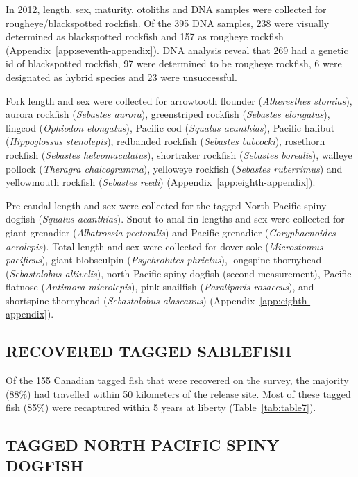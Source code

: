 \documentclass[12pt]{article}\usepackage[]{graphicx}\usepackage[]{color}
\begin{document}
In 2012, length, sex, maturity, otoliths and DNA samples were collected for rougheye/blackspotted rockfish. Of the 395 DNA samples, 238 were visually determined as blackspotted rockfish and 157 as rougheye rockfish (Appendix~\ref{app:seventh-appendix}). DNA analysis reveal that 269 had a genetic id of blackspotted rockfish, 97 were determined to be rougheye rockfish, 6 were designated as hybrid species and 23 were unsuccessful.

Fork length and sex were collected for arrowtooth flounder (\emph{Atheresthes stomias}), aurora rockfish (\emph{Sebastes aurora}), greenstriped rockfish (\emph{Sebastes elongatus}), lingcod (\emph{Ophiodon elongatus}), Pacific cod (\emph{Squalus acanthias}), Pacific halibut (\emph{Hippoglossus stenolepis}), redbanded rockfish (\emph{Sebastes babcocki}), rosethorn rockfish (\emph{Sebastes helvomaculatus}), shortraker rockfish (\emph{Sebastes borealis}), walleye pollock (\emph{Theragra chalcogramma}), yelloweye rockfish (\emph{Sebastes ruberrimus}) and yellowmouth rockfish (\emph{Sebastes reedi}) (Appendix~\ref{app:eighth-appendix}).

Pre-caudal length and sex were collected for the tagged North Pacific spiny dogfish (\emph{Squalus acanthias}). Snout to anal fin lengths and sex were collected for giant grenadier (\emph{Albatrossia pectoralis}) and Pacific grenadier (\emph{Coryphaenoides acrolepis}). Total length and sex were collected for dover sole (\emph{Microstomus pacificus}), giant blobsculpin (\emph{Psychrolutes phrictus}), longspine thornyhead (\emph{Sebastolobus altivelis}), north Pacific spiny dogfish (second measurement), Pacific flatnose (\emph{Antimora microlepis}), pink snailfish (\emph{Paraliparis rosaceus}), and shortspine thornyhead (\emph{Sebastolobus alascanus}) (Appendix~\ref{app:eighth-appendix}).

\hypertarget{recovered-tagged-sablefish}{%
\subsection{RECOVERED TAGGED SABLEFISH}\label{recovered-tagged-sablefish}}

Of the 155 Canadian tagged fish that were recovered on the survey, the majority (88\%) had travelled within 50 kilometers of the release site. Most of these tagged fish (85\%) were recaptured within 5 years at liberty (Table~\ref{tab:table7}).

\hypertarget{tagged-north-pacific-spiny-dogfish}{%
\subsection{TAGGED NORTH PACIFIC SPINY DOGFISH}\label{tagged-north-pacific-spiny-dogfish}}
\end{document}
